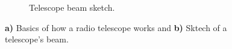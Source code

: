 \begin{figure}[H]
\begin{subfigure}[t]{0.49\textwidth}
       \caption{Telescope beam sketch.}
       \label{subfig:beamwidth}
    \end{subfigure}
    \caption[Radio telescope basics]{\textbf{a)} Basics of how a radio telescope works and \textbf{b)} Sktech of a telescope's beam.}
    \label{fig:telescope_info}
\end{figure}



